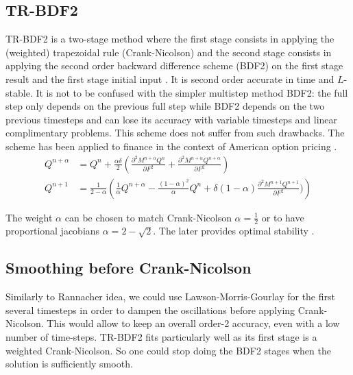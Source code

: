 \documentclass[]{rAMF2e}
\begin{document}
\subsection{TR-BDF2}
TR-BDF2 is a two-stage method where the first stage consists in applying the (weighted) trapezoidal rule (Crank-Nicolson) and the second stage consists in applying the second order backward difference scheme (BDF2) on the first stage result and the first stage initial input \citep{bank1985transient, Le07}. It is second order accurate in time and $L$-stable. It is not to be confused with the simpler multistep method BDF2: the full step only depends on the previous full step while BDF2 depends on the two previous timesteps and can lose its accuracy \citep{windcliff2001shout} with variable timesteps and linear complimentary problems. This scheme does not suffer from such drawbacks. The scheme has been applied to finance in the context of American option pricing \citep{floc2013tr}.
\begin{align}
Q^{n+\alpha} &= Q^n + \frac{\alpha \delta}{2}\left(\frac{\partial^2 M^{n+\alpha} Q^n}{\partial F^2}+\frac{\partial^2 M^{n+\alpha} Q^{n+\alpha}}{\partial F^2}\right)\\
Q^{n+1} &= \frac{1}{2-\alpha}\left(\frac{1}{\alpha} Q^{n+\alpha} - \frac{(1-\alpha)^2}{\alpha}Q^n + \delta(1-\alpha)\frac{\partial^2 M^{n+1} Q^{n+1}}{\partial F^2})\right)
\end{align}

The weight $\alpha$ can be chosen to match Crank-Nicolson $\alpha=\frac{1}{2}$ or to have proportional jacobians $\alpha = 2-\sqrt{2}$. The later provides optimal stability \citep{dharmaraja2009optimal}. 

\subsection{Smoothing before Crank-Nicolson}
Similarly to Rannacher idea, we could use Lawson-Morris-Gourlay for the first several timesteps in order to dampen the oscillations before applying Crank-Nicolson. This would allow to keep an overall order-2 accuracy, even with a low number of time-steps. TR-BDF2 fits particularly well as its first stage is a weighted Crank-Nicolson. So one could stop doing the BDF2 stages when the solution is sufficiently smooth. 
\end{document}
